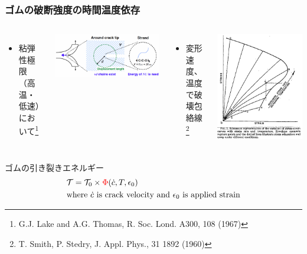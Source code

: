 \documentclass[aspectratio=169,11pt, dvipdfmx]{beamer}
\begin{document}
\begin{frame}
    \frametitle{ゴムの破断強度の時間温度依存}
	\vspace{-2mm}
    \begin{columns}[T, totalwidth=\textwidth]
    \begin{itemize}
		\item \alert{粘弾性極限（高温・低速）において}\footnote{
			\tiny{G.J. Lake and A.G. Thomas, R. Soc. Lond. A300, 108 (1967)}
            }
		
	\end{itemize}
    \centering
    \includegraphics[width=\textwidth]{Lake_Thomas.png}
    
    \begin{itemize}
		\item 変形速度、温度で\alert{破壊包絡線}\footnote{
			\tiny{T. Smith, P. Stedry, J. Appl. Phys., 31 1892 (1960)}
		}
	\end{itemize}
	\begin{center}
		\includegraphics[width=.3\textwidth]{Time_Temp_3.png}
	\end{center}
    \end{columns}
    \begin{alertblock}{ゴムの引き裂きエネルギー}
		\vspace{-2mm}
		\begin{align*}
			&\mathcal{T}=\mathcal{T}_0 \times {\color{red}\Phi}(\dot{c}, T, \epsilon_0) \\
			&\text{where $\dot{c}$ is crack velocity and $\epsilon_0$ is applied strain}
		\end{align*}
    \end{alertblock}
\end{frame}
\end{document}
